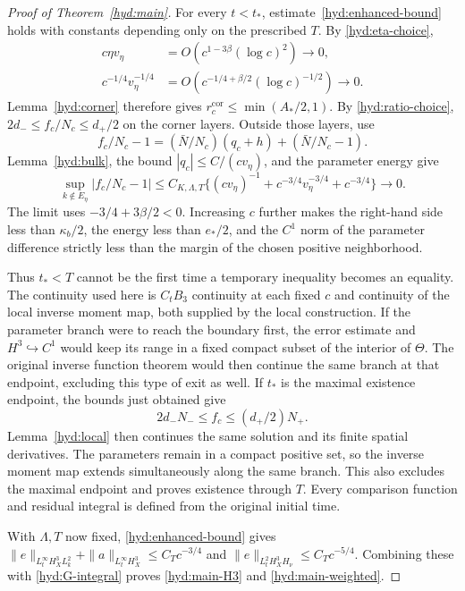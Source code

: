 \begin{proof}[Proof of Theorem~\ref{hyd:main}]
 For every $t<t_*$, estimate~\eqref{hyd:enhanced-bound} holds with
 constants depending only on the prescribed $T$. By
 \eqref{hyd:eta-choice},
 \begin{align*}
 c\eta v_\eta&=O(c^{1-3\beta}(\log c)^2)\longrightarrow0,\\
 c^{-1/4}v_\eta^{-1/4}
       &=O(c^{-1/4+\beta/2}(\log c)^{-1/2})\longrightarrow0.
 \end{align*}
 Lemma~\ref{hyd:corner} therefore gives
 $r_c^{\mathrm{cor}}\le\min(A_*/2,1)$. By \eqref{hyd:ratio-choice},
 $2d_-\le f_c/N_c\le d_+/2$ on the corner layers.
 Outside those layers, use
 \[
 f_c/N_c-1=(\bar N/N_c)(q_c+h)+(\bar N/N_c-1).
 \]
 Lemma~\ref{hyd:bulk}, the bound $|q_c|\le C/(cv_\eta)$, and the
 parameter energy give
 \begin{equation}\label{hyd:bulk-ratio-improvement}
 \sup_{k\notin E_\eta}|f_c/N_c-1|
 \le C_{K,\Lambda,T}\{(cv_\eta)^{-1}
          +c^{-3/4}v_\eta^{-3/4}+c^{-3/4}\}\longrightarrow0.
 \end{equation}
 The limit uses $-3/4+3\beta/2<0$. Increasing $c$ further makes the
 right-hand side less than $\kappa_b/2$, the energy less than $e_*/2$,
 and the $C^1$ norm of the parameter difference strictly less than
 the margin of the chosen positive neighborhood.

 Thus $t_*<T$ cannot be the first time a temporary inequality becomes
 an equality. The continuity used here is $C_tB_3$ continuity at each
 fixed $c$ and continuity of the local inverse moment map, both supplied
 by the local construction. If the parameter branch were to reach
 the boundary first, the error estimate and $H^3\hookrightarrow C^1$
 would keep its range in a fixed compact subset of the interior of
 $\Theta$. The original inverse function theorem would then continue
 the same branch at that endpoint, excluding this type of exit as well.
 If $t_*$ is the maximal existence endpoint, the bounds just obtained give
 \[
 2d_-N_-\le f_c\le(d_+/2)N_+.
 \]
 Lemma~\ref{hyd:local} then continues the same solution and its finite
 spatial derivatives. The parameters remain in a compact positive set,
 so the inverse moment map extends simultaneously along the same branch.
 This also excludes the maximal endpoint and proves existence through
 $T$. Every comparison function and residual integral is defined from
 the original initial time.

 With $\Lambda,T$ now fixed, \eqref{hyd:enhanced-bound} gives
 $\|e\|_{L^\infty_tH_X^3L_k^2}+\|a\|_{L^\infty_tH_X^3}
 \le C_Tc^{-3/4}$ and
 $\|e\|_{L^2_tH_X^3H_\nu}\le C_Tc^{-5/4}$.
 Combining these with \eqref{hyd:G-integral} proves
 \eqref{hyd:main-H3} and \eqref{hyd:main-weighted}.


\end{proof}
